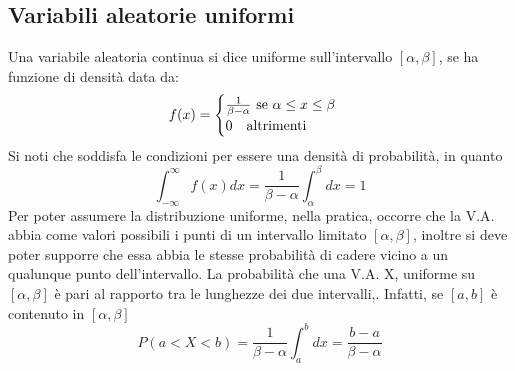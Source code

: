 \documentclass[11pt]{article}
\begin{document}
\subsection{Variabili aleatorie uniformi}
Una variabile aleatoria continua si dice uniforme sull'intervallo $[\alpha,\beta]$, se ha funzione di densità data da:
\begin{displaymath}
    f(x)=
    \begin{cases}
        \frac{1}{\beta-\alpha} \mbox{ se }\alpha\le x \le \beta\\
        0\hspace{10px}\mbox{altrimenti} 
    \end{cases}
\end{displaymath}
Si noti che soddisfa le condizioni per essere una densità di probabilità, in quanto
\begin{displaymath}
    \int_{-\infty}^\infty f(x)dx =\frac{1}{\beta-\alpha}\int_\alpha^\beta dx=1
\end{displaymath}
Per poter assumere la distribuzione uniforme, nella pratica, occorre che la V.A. abbia come valori possibili i punti di un intervallo limitato $[\alpha,\beta]$, inoltre si deve poter supporre che essa abbia le stesse probabilità di cadere vicino a un qualunque punto dell'intervallo.
La probabilità che una V.A. X, uniforme su $[\alpha,\beta]$ è pari al rapporto tra le lunghezze dei due intervalli,. Infatti, se $[a,b]$ è contenuto in $[\alpha,\beta]$
\begin{displaymath}
    P(a<X<b)=\frac{1}{\beta-\alpha}\int_a^b dx = \frac{b-a}{\beta-\alpha}
\end{displaymath}
\end{document}
